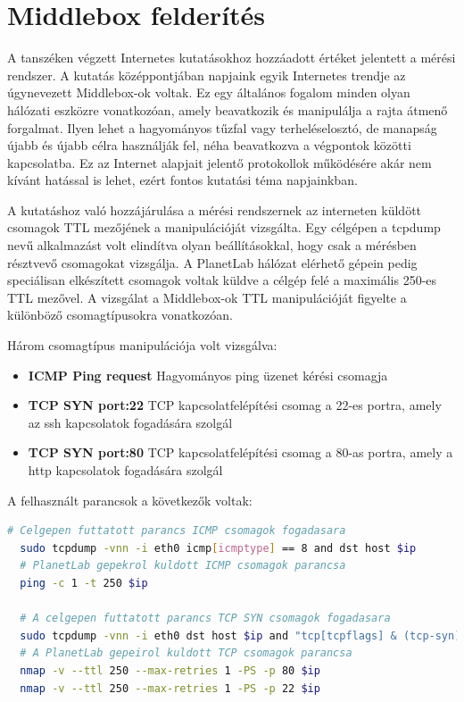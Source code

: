 \section{Middlebox felderítés}
A tanszéken végzett Internetes kutatásokhoz hozzáadott értéket jelentett a mérési rendszer. A kutatás középpontjában napjaink egyik Internetes trendje az úgynevezett Middlebox-ok voltak. Ez egy általános fogalom minden olyan hálózati eszközre vonatkozóan, amely beavatkozik és manipulálja a rajta átmenő forgalmat. Ilyen lehet a hagyományos tűzfal vagy terheléselosztó, de manapság újabb és újabb célra használják fel, néha beavatkozva a végpontok közötti kapcsolatba. Ez az Internet alapjait jelentő protokollok működésére akár nem kívánt hatással is lehet, ezért fontos kutatási téma napjainkban.

A kutatáshoz való hozzájárulása a mérési rendszernek az interneten küldött csomagok TTL mezőjének a manipulációját vizsgálta. Egy célgépen a tcpdump nevű alkalmazást volt elindítva olyan beállításokkal, hogy csak a mérésben résztvevő csomagokat vizsgálja. A PlanetLab hálózat elérhető gépein pedig speciálisan elkészített csomagok voltak küldve a célgép felé a maximális 250-es TTL mezővel. A vizsgálat a Middlebox-ok TTL manipulációját figyelte a különböző csomagtípusokra vonatkozóan.

Három csomagtípus manipulációja volt vizsgálva:

\begin{itemize}
\item \textbf{ICMP Ping request} Hagyományos ping üzenet kérési csomagja
\item \textbf{TCP SYN port:22} TCP kapcsolatfelépítési csomag a 22-es portra, amely az ssh kapcsolatok fogadására szolgál
\item \textbf{TCP SYN port:80} TCP kapcsolatfelépítési csomag a 80-as portra, amely a http kapcsolatok fogadására szolgál
\end{itemize}

\pagebreak

A felhasznált parancsok a következők voltak:

\begin{lstlisting}[language=bash]
  # Celgepen futtatott parancs ICMP csomagok fogadasara
  sudo tcpdump -vnn -i eth0 icmp[icmptype] == 8 and dst host $ip
  # PlanetLab gepekrol kuldott ICMP csomagok parancsa
  ping -c 1 -t 250 $ip
  
  # A celgepen futtatott parancs TCP SYN csomagok fogadasara
  sudo tcpdump -vnn -i eth0 dst host $ip and "tcp[tcpflags] & (tcp-syn) != 0"
  # A PlanetLab gepeirol kuldott TCP csomagok parancsa
  nmap -v --ttl 250 --max-retries 1 -PS -p 80 $ip
  nmap -v --ttl 250 --max-retries 1 -PS -p 22 $ip
\end{lstlisting}


